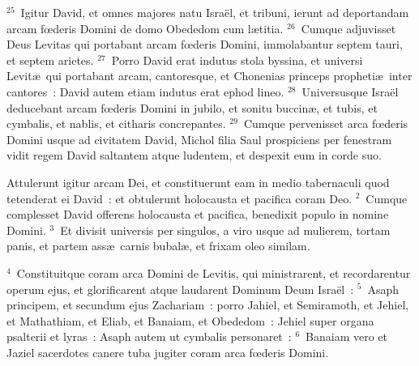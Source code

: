 ${}^{25}$~Igitur David, et omnes majores natu Isra\"el, et tribuni, ierunt ad deportandam arcam fœderis Domini de domo Obededom cum l\ae titia.
${}^{26}$~Cumque adjuvisset Deus Levitas qui portabant arcam fœderis Domini, immolabantur septem tauri, et septem arietes.
${}^{27}$~Porro David erat indutus stola byssina, et universi Levit\ae\ qui portabant arcam, cantoresque, et Chonenias princeps propheti\ae\ inter cantores~: David autem etiam indutus erat ephod lineo.
${}^{28}$~Universusque Isra\"el deducebant arcam fœderis Domini in jubilo, et sonitu buccin\ae , et tubis, et cymbalis, et nablis, et citharis concrepantes.
${}^{29}$~Cumque pervenisset arca fœderis Domini usque ad civitatem David, Michol filia Saul prospiciens per fenestram vidit regem David saltantem atque ludentem, et despexit eum in corde suo.

\lettrine[lines=3,image=true,loversize=0.05,lraise=-0.03]{A}{}ttulerunt igitur arcam Dei, et constituerunt eam in medio tabernaculi quod tetenderat ei David~: et obtulerunt holocausta et pacifica coram Deo.
${}^{2}$~Cumque complesset David offerens holocausta et pacifica, benedixit populo in nomine Domini.
${}^{3}$~Et divisit universis per singulos, a viro usque ad mulierem, tortam panis, et partem ass\ae\ carnis bubal\ae , et frixam oleo similam.


${}^{4}$~Constituitque coram arca Domini de Levitis, qui ministrarent, et recordarentur operum ejus, et glorificarent atque laudarent Dominum Deum Isra\"el~:
${}^{5}$~Asaph principem, et secundum ejus Zachariam~: porro Jahiel, et Semiramoth, et Jehiel, et Mathathiam, et Eliab, et Banaiam, et Obededom~: Jehiel super organa psalterii et lyras~: Asaph autem ut cymbalis personaret~:
${}^{6}$~Banaiam vero et Jaziel sacerdotes canere tuba jugiter coram arca fœderis Domini.


